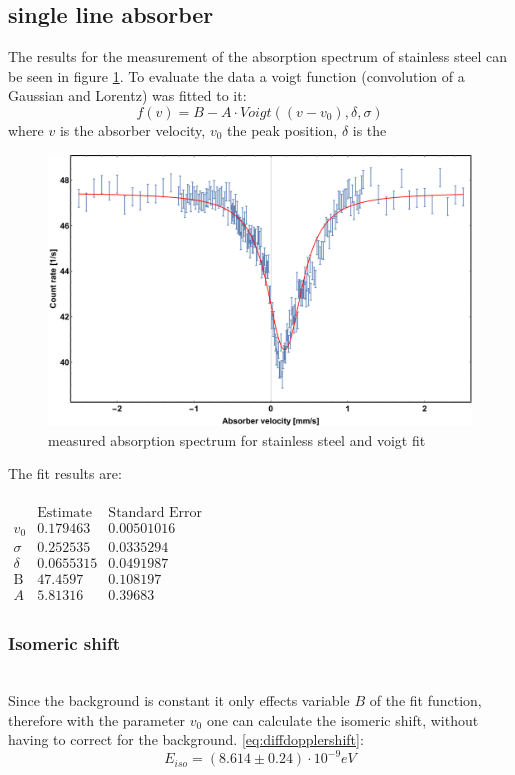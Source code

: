  \subsection{single line absorber}
 The results for the measurement of the absorption spectrum of stainless steel can be seen in figure \ref{fig:single line absorber:fitresult}. To evaluate the data a voigt function (convolution of a Gaussian and Lorentz) was fitted to it:
 \begin{equation}
 f(v)=B- A \cdot Voigt((v-v_0),\delta,\sigma )
 \end{equation}
 where $v$ is the absorber velocity, $v_0$ the peak position, $\delta$ is the 
\begin{figure}[H]
\centering
\includegraphics[width=0.7\linewidth]{../results/steel/voigtfittry.pdf}
\caption[stainless steel spectrum]{measured absorption spectrum for stainless steel and voigt fit}
\label{fig:single line absorber:fitresult}
\end{figure}
The fit results are:\\ \ \\
$\begin{array}{l|llll}
\text{} & \text{Estimate} & \text{Standard Error} \\
\hline
v_0 & 0.179463 & 0.00501016\\
\sigma  & 0.252535 & 0.0335294 \\
\delta  & 0.0655315 & 0.0491987\\
\text{B} & 47.4597 & 0.108197\\
A & 5.81316 & 0.39683 &\\
\end{array}$

\subsubsection{Isomeric shift} \ \\
Since the background is constant it only effects variable $B$ of the fit function, therefore
with the parameter $v_0$ one can calculate the isomeric shift, without having to correct for the background. \ref{eq:diffdopplershift}:
\begin{equation}
E_{iso} = (8.614\pm0.24)\cdot 10^{-9} eV
\end{equation}

